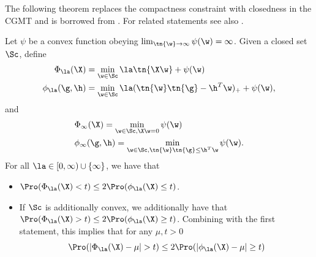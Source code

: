 The following theorem replaces the compactness constraint with  closedness in the CGMT and is borrowed from \cite{li2020exploring}. For related statements see also \cite[App.~A]{deng2019model}.
\begin{theorem} \label{thm closed} Let $\psi$ be a convex function obeying $\lim_{\tn{\w}\rightarrow\infty}\psi(\w)=\infty$. Given a closed set $\Sc$, define
\begin{align}
\Phi_\la(\X)&=\min_{\w\in\Sc}\la\tn{\X\w}+\psi(\w)\\
\phi_\la(\g,\h)&=\min_{\w\in\Sc}\la(\tn{\w}\tn{\g}-\h^T\w)_++\psi(\w),
\end{align}
and
\begin{align}
&\Phi_\infty(\X)=\min_{\w\in\Sc,\X\w=0}\psi(\w)\\
&\phi_\infty(\g,\h)=\min_{\w\in\Sc,\tn{\w}\tn{\g}\leq \h^T\w}\psi(\w).
\end{align}
For all $\la\in[0,\infty)\cup\{\infty\}$, we have that
\begin{itemize}
\item $\Pro(\Phi_\la(\X)<t)\leq2\Pro(\phi_\la(\X)\leq t)$.
\item If $\Sc$ is additionally convex, we additionally have that $\Pro(\Phi_\la(\X)>t)\leq2\Pro(\phi_\la(\X)\geq t)$. Combining with the first statement, this implies that for any $\mu,t>0$
\[
\Pro(|\Phi_\la(\X)-\mu|>t)\leq2\Pro(|\phi_\la(\X)-\mu|\geq t)
\]
\end{itemize}
\end{theorem}


